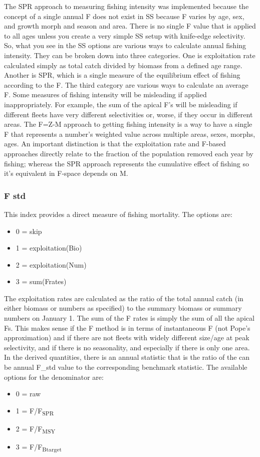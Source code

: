 The SPR approach to measuring fishing intensity was implemented because the concept of a single annual F does not exist in SS because F varies by age, sex, and growth morph and season and area.  There is no single F value that is applied to all ages unless you create a very simple SS setup with knife-edge selectivity.  So, what you see in the SS options are various ways to calculate annual fishing intensity.  They can be broken down into three categories.  One is exploitation rate calculated simply as total catch divided by biomass from a defined age range. Another is SPR, which is a single measure of the equilibrium effect of fishing according to the F.  The third category are various ways to calculate an average F. Some measures of fishing intensity will be misleading if applied inappropriately. For example, the sum of the apical F's will be misleading if different fleets have very different selectivities or, worse, if they occur in different areas. The F=Z-M approach to getting fishing intensity is a way to have a single F that represents a number's weighted value across multiple areas, sexes, morphs, ages. An important distinction is that the exploitation rate and F-based approaches directly relate to the fraction of the population removed each year by fishing; whereas the SPR approach represents the cumulative effect of fishing so it's equivalent in F-space depends on M.

\subsubsection{F std}
This index provides a direct measure of fishing mortality.  The options are:
\begin{itemize}
	\item 0 = skip
	\item 1 = exploitation(Bio)
	\item 2 = exploitation(Num)
	\item 3 = sum(Frates)
\end{itemize}
The exploitation rates are calculated as the ratio of the total annual catch (in either biomass or numbers as specified) to the summary biomass or summary numbers on January 1.  The sum of the F rates is simply the sum of all the apical Fs.  This makes sense if the F method is in terms of instantaneous F (not Pope's approximation) and if there are not fleets with widely different size/age at peak selectivity, and if there is no seasonality, and especially if there is only one area.  In the derived quantities, there is an annual statistic that is the ratio of the can be annual F\_std value to the corresponding benchmark statistic.  The available options for the denominator are:
\begin{itemize}
	\item 0 = raw
	\item 1 = F/F\textsubscript {SPR}
	\item 2 = F/F\textsubscript {MSY}
	\item 3 = F/F\textsubscript {Btarget}
\end{itemize}

